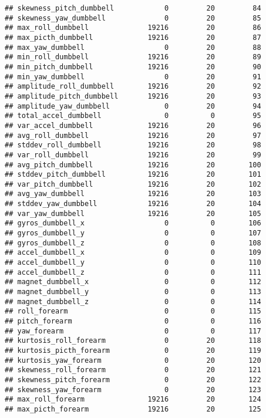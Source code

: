 \documentclass[]{article}
\begin{document}
\begin{verbatim}
## skewness_pitch_dumbbell            0         20         84
## skewness_yaw_dumbbell              0         20         85
## max_roll_dumbbell              19216         20         86
## max_picth_dumbbell             19216         20         87
## max_yaw_dumbbell                   0         20         88
## min_roll_dumbbell              19216         20         89
## min_pitch_dumbbell             19216         20         90
## min_yaw_dumbbell                   0         20         91
## amplitude_roll_dumbbell        19216         20         92
## amplitude_pitch_dumbbell       19216         20         93
## amplitude_yaw_dumbbell             0         20         94
## total_accel_dumbbell               0          0         95
## var_accel_dumbbell             19216         20         96
## avg_roll_dumbbell              19216         20         97
## stddev_roll_dumbbell           19216         20         98
## var_roll_dumbbell              19216         20         99
## avg_pitch_dumbbell             19216         20        100
## stddev_pitch_dumbbell          19216         20        101
## var_pitch_dumbbell             19216         20        102
## avg_yaw_dumbbell               19216         20        103
## stddev_yaw_dumbbell            19216         20        104
## var_yaw_dumbbell               19216         20        105
## gyros_dumbbell_x                   0          0        106
## gyros_dumbbell_y                   0          0        107
## gyros_dumbbell_z                   0          0        108
## accel_dumbbell_x                   0          0        109
## accel_dumbbell_y                   0          0        110
## accel_dumbbell_z                   0          0        111
## magnet_dumbbell_x                  0          0        112
## magnet_dumbbell_y                  0          0        113
## magnet_dumbbell_z                  0          0        114
## roll_forearm                       0          0        115
## pitch_forearm                      0          0        116
## yaw_forearm                        0          0        117
## kurtosis_roll_forearm              0         20        118
## kurtosis_picth_forearm             0         20        119
## kurtosis_yaw_forearm               0         20        120
## skewness_roll_forearm              0         20        121
## skewness_pitch_forearm             0         20        122
## skewness_yaw_forearm               0         20        123
## max_roll_forearm               19216         20        124
## max_picth_forearm              19216         20        125

\end{verbatim}
\end{document}
